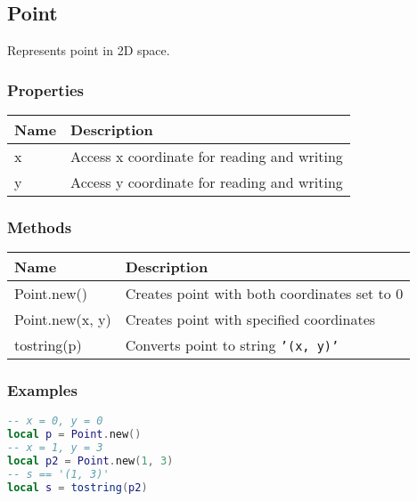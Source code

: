 \subsection{Point}
\label{Point}
Represents point in 2D space.
\subsubsection{Properties}
\begin{center}
\begin{tabularx}{\linewidth}{| l | X |}
\hline
\textbf{Name} & \textbf{Description} \\
\hline
x & Access x coordinate for reading and writing\\
\hline
y & Access y coordinate for reading and writing\\
\hline
\end{tabularx}
\end{center}
\subsubsection{Methods}
\begin{center}
\begin{tabularx}{\linewidth}{| l | X |}
\hline
\textbf{Name} & \textbf{Description} \\
\hline
Point.new() & Creates point with both coordinates set to 0\\
\hline
Point.new(x, y) & Creates point with specified coordinates\\
\hline
tostring(p) & Converts point to string \texttt{'(x, y)'}\\
\hline
\end{tabularx}
\end{center}
\subsubsection{Examples}
\begin{center}
\begin{lstlisting}[language=Lua]
-- x = 0, y = 0
local p = Point.new()
-- x = 1, y = 3
local p2 = Point.new(1, 3)
-- s == '(1, 3)'
local s = tostring(p2)
\end{lstlisting}
\end{center}